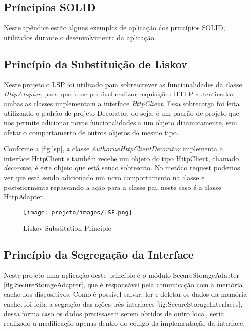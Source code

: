 \documentclass[12pt]{article}
\begin{document}



\newpage

\begin{appendices}
\section{Príncipios SOLID}
\label{apx:solid}
Neste apêndice estão alguns exemplos de aplicação dos princípios SOLID, utilizados durante o desenvolvimento da aplicação. 

\subsection{Princípio da Substituição de Liskov}
Neste projeto o LSP foi utilizado para sobrescrever as funcionalidades da classe \emph{HttpAdapter}, para que fosse possível realizar requisições HTTP autenticadas, ambas as classes implementam a interface \emph{HttpClient}. Essa sobrecarga foi feita utilizando o padrão de projeto Decorator, ou seja, é um padrão de projeto que nos permite adicionar novas funcionalidades  a um objeto dinamicamente, sem afetar o comportamento de outros objetos do mesmo tipo.

Conforme a \autoref{fig:lsp}, a classe \emph{AuthorizeHttpClientDecorator} implementa a interface HttpClient e também recebe um objeto do tipo HttpClient, chamado \emph{decoratee}, é este objeto que está sendo sobrescito. No metódo request podemos ver que está sendo adicionado um novo comportamento na classe e posteriormente repassando a ação para a classe pai, neste caso é a classe HttpAdapter.

\begin{figure}[!ht]
  \centering
  \texttt{[image: projeto/images/LSP.png]}
  \caption{Liskov Substitution Principle}
  \label{fig:lsp}
\end{figure}

\subsection{Princípio da Segregação da Interface}
Neste projeto uma aplicação deste princípio é o módulo SecureStorageAdapter \autoref{fig:SecureStorageAdapter}, que é responsável pela comunicação com a memória cache dos dispositivos. Como é possível salvar, ler e deletar os dados da memória cache, foi feita a segração das ações três interfaces \autoref{fig:SecureStorageInterfaces}, dessa forma caso os dados precissasem serem obtidos de outro local, seria realizado a modificação apenas dentro do código da implementação da interface.


\end{appendices}
\end{document}
